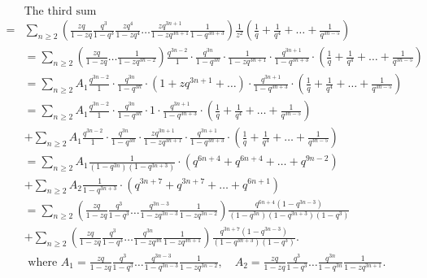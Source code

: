 \documentclass[draft]{amsart}
\numberwithin{equation}{section}
\theoremstyle{plain}
\theoremstyle{remark}
\begin{document}
\begin{align*}
&\mbox{The third sum }\\
=&\sum_{n\geq 2}\left(\frac{zq}{1-zq}\frac{q^{3}}{1-q^{3}} \frac{zq^{4}}{1-zq^{4}}\dots\frac{zq^{3n+1}}{1-zq^{3n+1}}\frac{1}{1-q^{3n+3}}\right)
\frac{1}{z^{2}}\left( \frac{1}{q} +\frac{1}{q^{4}}+\dots+\frac{1}{q^{3n-5}}    \right)\\
&=\sum_{n\geq 2}\left(\frac{zq}{1-zq}\dots\frac{1}{1-zq^{3n-2}}\right)\frac{q^{3n-2}}{1}\cdot\frac{q^{3n}}{1-q^{3n}}\cdot\frac{1}{1-zq^{3n+1}}\cdot\frac{q^{3n+1}}{1-q^{3n+3}}\cdot\left( \frac{1}{q} +\frac{1}{q^{4}}+\dots+\frac{1}{q^{3n-5}}    \right)\\
&=\sum_{n\geq 2}A_{1}\frac{q^{3n-2}}{1}\cdot\frac{q^{3n}}{1-q^{3n}}\cdot(1+zq^{3n+1}+\dots)\cdot\frac{q^{3n+1}}{1-q^{3n+3}}\cdot\left( \frac{1}{q} +\frac{1}{q^{4}}+\dots+\frac{1}{q^{3n-5}}    \right)\\
&=\sum_{n\geq 2}A_{1}\frac{q^{3n-2}}{1}\cdot\frac{q^{3n}}{1-q^{3n}}\cdot1\cdot\frac{q^{3n+1}}{1-q^{3n+3}}\cdot\left( \frac{1}{q} +\frac{1}{q^{4}}+\dots+\frac{1}{q^{3n-5}}    \right)\\
&+\sum_{n\geq 2}A_{1}\frac{q^{3n-2}}{1}\cdot\frac{q^{3n}}{1-q^{3n}}\cdot\frac{zq^{3n+1}}{1-zq^{3n+1}}\cdot\frac{q^{3n+1}}{1-q^{3n+3}}\cdot\left( \frac{1}{q} +\frac{1}{q^{4}}+\dots+\frac{1}{q^{3n-5}}    \right)\\
&=\sum_{n\geq 2}A_{1}\frac{1}{(1-q^{3n})(1-q^{3n+3})}\cdot\left(q^{6n+4}   +q^{6n+4}+\dots +q^{9n-2}
\right)\\
&+\sum_{n\geq 2}A_{2}\frac{1}{1-q^{3n+3}}\cdot\left( q^{3n+7} +q^{3n+7}   +\dots+q^{6n+1}      \right)\\
&=\sum_{n\geq 2}\left(\frac{zq}{1-zq}\frac{q^{3}}{1-q^{3}}\dots\frac{q^{3n-3}}{1-zq^{3n-3}}\frac{1}{1-zq^{3n-2}}\right)\frac{q^{6n+4}(1-q^{3n-3})}{(1-q^{3n})(1-q^{3n+3})(1-q^{3})}   \\
&+\sum_{n\geq 2}\left(\frac{zq}{1-zq}\frac{q^{3}}{1-q^{3}}\dots\frac{q^{3n}}{1-zq^{3n}}\frac{1}{1-zq^{3n+1}}\right)\frac{q^{3n+7}(1-q^{3n-3})}{(1-q^{3n+3})(1-q^{3})}.    \\
&\mbox{ where }A_{1}=\frac{zq}{1-zq}\frac{q^{3}}{1-q^{3}} \dots\frac{q^{3n-3}}{1-q^{3n-3}}\frac{1}{1-zq^{3n-2}},\quad
A_{2}=\frac{zq}{1-zq}\frac{q^{3}}{1-q^{3}}\dots\frac{q^{3n}}{1-q^{3n}}\frac{1}{1-zq^{3n+1}}.
\end{align*}
\end{document}
